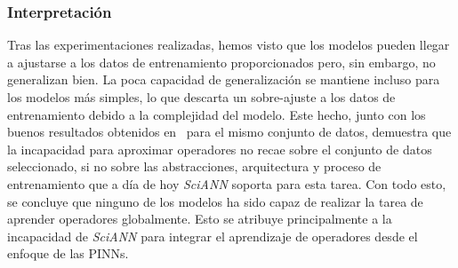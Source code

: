 \subsubsection{Interpretación}

Tras las experimentaciones realizadas, hemos visto que los modelos pueden llegar a ajustarse a los datos de entrenamiento proporcionados pero, sin embargo, no generalizan bien. La poca capacidad de generalización se mantiene incluso para los modelos más simples, lo que descarta un sobre-ajuste a los datos de entrenamiento debido a la complejidad del modelo. Este hecho, junto con los buenos resultados obtenidos en~\cite{lu2024deeponet} para el mismo conjunto de datos, demuestra que la incapacidad para aproximar operadores no recae sobre el conjunto de datos seleccionado, si no sobre las abstracciones, arquitectura y proceso de entrenamiento que a día de hoy \textit{SciANN} soporta para esta tarea. Con todo esto, se concluye que ninguno de los modelos ha sido capaz de realizar la tarea de aprender operadores globalmente. Esto se atribuye principalmente a la incapacidad de \textit{SciANN} para integrar el aprendizaje de operadores desde el enfoque de las PINNs. 
